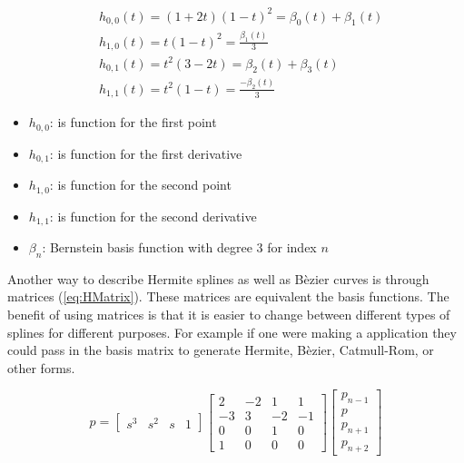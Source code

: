 \documentclass[12pt, letterpaper]{article}
\begin{document}
\begin{singlespace}
  \begin{equation}
    \begin{aligned}
      &h_{0,0}(t) = (1+2t)(1-t)^2 = \beta_0(t) + \beta_1(t) \\
      &h_{1,0}(t) = t(1-t)^2 = \frac{\beta_1(t)}{3}\\
      &h_{0,1}(t) = t^2(3-2t) = \beta_2(t) + \beta_3(t)\\
      &h_{1,1}(t) = t^2(1-t) = \frac{-\beta_2(t)}{3}
    \end{aligned}
  \end{equation}
  \begin{small}
    \begin{itemize}[label=]
      \item $h_{0,0}$: is function for the first point
      \item $h_{0,1}$: is function for the first derivative
      \item $h_{1,0}$: is function for the second point
      \item $h_{1,1}$: is function for the second derivative
      \item $\beta_n$: Bernstein basis function with degree 3 for index $n$
    \end{itemize}
  \end{small}
\end{singlespace}

Another way to describe Hermite splines as well as B\`ezier curves is through matrices (\ref{eq:HMatrix}).
These matrices are equivalent the basis functions. The benefit of using matrices is that it is easier to change
between different types of splines for different purposes. For example if one were making a application they
could pass in the basis matrix to generate Hermite, B\`ezier, Catmull-Rom, or other forms.

\begin{equation}
  \label{eq:HMatrix}
  p = 
  \begin{bmatrix}
    s^3 & s^2 & s & 1
  \end{bmatrix}
  \begin{bmatrix}
     2 & -2 &  1 &  1 \\
    -3 &  3 & -2 & -1 \\
     0 &  0 &  1 &  0 \\
     1 &  0 &  0 &  0
  \end{bmatrix}
  \begin{bmatrix}
    p_{n-1} \\
    p \\
    p_{n+1} \\
    p_{n+2}
  \end{bmatrix}
\end{equation}
\end{document}
